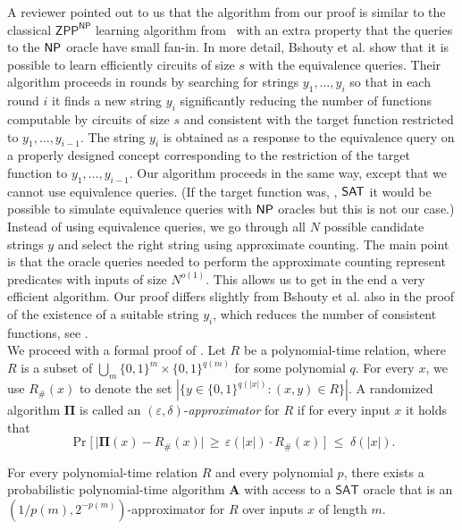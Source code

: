 \documentclass{toc}
\newcommand{\NP}{\ensuremath{{\sf NP}}\xspace}
\newcommand{\SAT}{\ensuremath{{\sf SAT}}\xspace}
\begin{document}
 A reviewer pointed out to us that the algorithm from our proof is %
similar to the classical $\mathsf{ZPP}^{\mathsf{NP}}$ learning algorithm from~\cite{DBLP:journals/jcss/BshoutyCGKT96} with an extra property that the queries to the \NP oracle have small fan-in. In more detail, Bshouty et al. show that it is possible to learn efficiently circuits of size $s$ with the equivalence queries. Their algorithm proceeds in rounds by searching for strings $y_1,\dots,y_i$ so that in each round $i$ it finds a new string $y_i$ significantly reducing the number of functions computable by circuits of size $s$ and consistent with the target function restricted to $y_1,\dots,y_{i-1}$. The string $y_i$ is obtained as a response to the equivalence query on a properly designed concept corresponding to the restriction of the target function to $y_1,\dots,y_{i-1}$. Our algorithm proceeds in the same way, except that we cannot use equivalence queries. (If the target function was, \eg, \SAT it would be possible to simulate equivalence queries with \NP oracles but this is not our case.) Instead of using equivalence queries, we go through all $N$ possible candidate strings $y$ and select the right string using approximate counting. The main point is that the oracle queries needed to perform the approximate counting represent predicates with inputs of size $N^{o(1)}$. This allows us to get in the end a very efficient algorithm. Our proof differs slightly from Bshouty et al. also in the proof of the existence of a suitable string $y_i$, which reduces the number of consistent functions, see . \\


We proceed with a formal proof of . Let $R$ be a polynomial-time relation, where
%
%
%
$R$ is a subset of $\bigcup_m \{0,1\}^m \times \{0,1\}^{q(m)}$  %
for some polynomial $q$. For every $x$, we use $R_{\#}(x)$ to denote
the set  %
$|\{y \in \{0,1\}^{q(|x|)} \colon (x,y) \in R\}|$. A randomized algorithm $\bm{\Pi}$ is called an $(\varepsilon, \delta)$-\emph{approximator} for $R$ if for every input $x$ it holds that
$$
\Pr \! \big [\,\big|\bm{\Pi}(x) - R_{\#}(x)\big| \,\geq\, \varepsilon(|x|) \cdot R_{\#}(x)\, \big ] \;\leq\; \delta(|x|).
$$

\begin{theorem} \label{thm:rel_counting}
For every polynomial-time relation $R$ and every polynomial $p$, there exists a probabilistic polynomial-time algorithm $\bm{A}$ with access to a $\mathsf{SAT}$ oracle that is an $(1/p(m), 2^{-p(m)})$-approximator for $R$ over inputs $x$ of length $m$.
\end{theorem}
\end{document}
